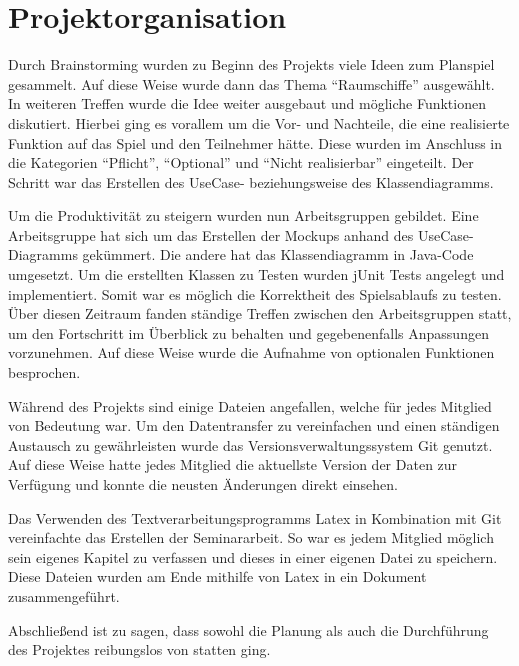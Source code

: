 \section{Projektorganisation}
\label{sec:fazit-projektorganisation}

Durch Brainstorming wurden zu Beginn des Projekts viele Ideen zum Planspiel gesammelt. Auf diese Weise wurde dann das Thema “Raumschiffe” ausgewählt. In weiteren Treffen wurde die Idee weiter ausgebaut und mögliche Funktionen diskutiert. Hierbei ging es vorallem um die Vor- und Nachteile, die eine realisierte Funktion auf das Spiel und den Teilnehmer hätte. Diese wurden im Anschluss in die Kategorien “Pflicht”, “Optional” und “Nicht realisierbar” eingeteilt. Der Schritt war das Erstellen des UseCase- beziehungsweise des Klassendiagramms. 

Um die Produktivität zu steigern wurden nun Arbeitsgruppen gebildet. Eine Arbeitsgruppe hat sich um das Erstellen der Mockups anhand des UseCase-Diagramms gekümmert. Die andere hat das Klassendiagramm  in Java-Code umgesetzt. Um die erstellten Klassen zu Testen wurden jUnit Tests angelegt und implementiert. Somit war es möglich die Korrektheit des Spielsablaufs zu testen. Über diesen Zeitraum fanden ständige Treffen zwischen den Arbeitsgruppen statt, um den Fortschritt im Überblick zu behalten und gegebenenfalls Anpassungen vorzunehmen. Auf diese Weise wurde die Aufnahme von optionalen Funktionen besprochen. 

Während des Projekts sind einige Dateien angefallen, welche für jedes Mitglied von Bedeutung war. Um den Datentransfer zu vereinfachen und einen ständigen Austausch zu gewährleisten wurde das Versionsverwaltungssystem Git genutzt. Auf diese Weise hatte jedes Mitglied die aktuellste Version der Daten zur Verfügung und konnte die neusten Änderungen direkt einsehen. 

Das Verwenden des Textverarbeitungsprogramms Latex in Kombination mit Git vereinfachte das Erstellen der Seminararbeit. So war es jedem Mitglied möglich sein eigenes Kapitel zu verfassen und dieses in einer eigenen Datei zu speichern. Diese Dateien wurden am Ende mithilfe von Latex in ein Dokument zusammengeführt.

Abschließend ist zu sagen, dass sowohl die Planung als auch die Durchführung des Projektes reibungslos von statten ging.